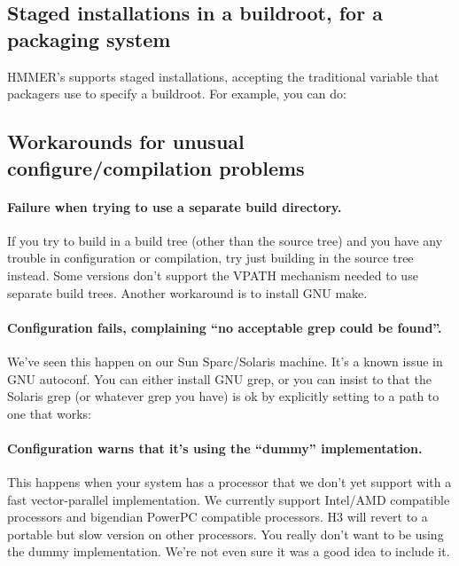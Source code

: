   \vspace{1ex}
  \vspace{1ex}


\subsection{Staged installations in a buildroot, for a packaging system}

HMMER's  supports staged installations, accepting
the traditional  variable that packagers use to specify
a buildroot. For example, you can do:

  \vspace{1ex}
  \vspace{1ex}




\subsection{Workarounds for unusual configure/compilation problems}

\paragraph{Failure when trying to use a
  separate build directory.}  If you try to build in a build tree
(other than the source tree) and you have any trouble in configuration
or compilation, try just building in the source tree instead. Some
 versions don't support the VPATH mechanism needed to use
separate build trees. Another workaround is to install GNU make.


\paragraph{Configuration fails, complaining ``no acceptable grep could
  be found''.} We've seen this happen on our Sun Sparc/Solaris
machine. It's a known issue in GNU autoconf. You can either install
GNU grep, or you can insist to  that the Solaris
grep (or whatever grep you have) is ok by explicitly setting
 to a path to one that works:

  \vspace{1ex}
  \vspace{1ex}

\paragraph{Configuration warns that it's using the ``dummy''
implementation.} This happens when your system has a processor that we
don't yet support with a fast vector-parallel implementation. We
currently support Intel/AMD compatible processors and bigendian
PowerPC compatible processors.  H3 will revert to a portable but slow
version on other processors. You really don't want to be using the
dummy implementation. We're not even sure it was a good idea to
include it.

